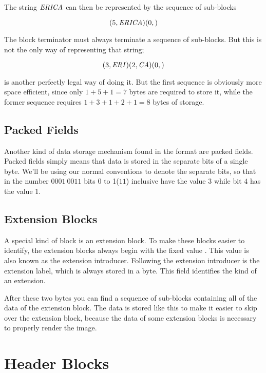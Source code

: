 The string $\mathit{ERICA}$ can then be represented by the sequence of
sub-blocks

\begin{equation*}
  (5,\mathit{ERICA})(0,)
\end{equation*}

The block terminator must always terminate a sequence of
sub-blocks. But this is not the only way of representing that string;

\begin{equation*}
  (3,\mathit{ERI})(2,\mathit{CA})(0,)
\end{equation*}

is another perfectly legal way of doing it. But the first sequence is
obviously more space efficient, since only $1 + 5 + 1 = 7$ bytes are
required to store it, while the former sequence requires $1 + 3 + 1 +
2 + 1 = 8$ bytes of storage.

\subsection{Packed Fields}

Another kind of data storage mechanism found in the \gif format are
packed fields. Packed fields simply means that data is stored in the
separate bits of a single byte. We'll be using our normal conventions
to denote the separate bits, so that in the number $0001\ 0011$ bits 0
to 1($11$) inclusive have the value $3$ while bit $4$ has the value
$1$.

\subsection{Extension Blocks}

A special kind of block is an extension block. To make these blocks
easier to identify, the extension blocks always begin with the fixed
value . This value is also known as the extension
introducer. Following the extension
introducer is the extension label, which is always stored in a
byte. This field identifies the kind of an extension.

After these two bytes you can find a sequence of sub-blocks containing
all of the data of the extension block. The data is stored like this
to make it easier to skip over the extension block, because the data
of some extension blocks is necessary to properly render the image.

\section{Header Blocks}

